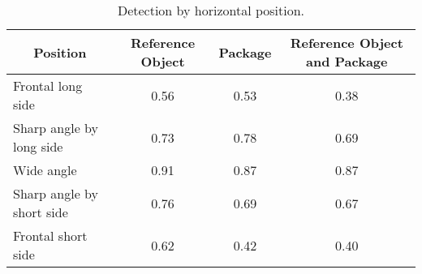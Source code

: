 \begin{table}[H]
\centering
\begin{tabular}{@{} l *3c @{}}
\toprule
 \multicolumn{1}{c}{Position} & Reference Object  & Package  & Reference Object and Package  \\ 
\midrule
 Frontal long side 			& 0.56 & 0.53 & 0.38 \\ 
 Sharp angle by long side  	& 0.73 & 0.78 & 0.69 \\
 Wide angle 				& 0.91 & 0.87 & 0.87 \\
 Sharp angle by short side 	& 0.76 & 0.69 & 0.67 \\
 Frontal short side 		& 0.62 & 0.42 & 0.40 \\
\bottomrule
 \end{tabular}
 \caption{Detection by horizontal position.}
\label{table:detection_by_position}
\end{table}